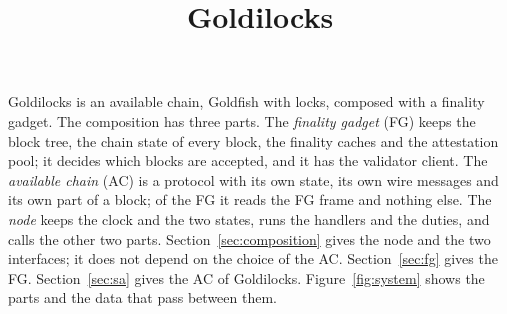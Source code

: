 \documentclass{article}
\title{Goldilocks}
\author{}
\date{}
\begin{document}
\maketitle

Goldilocks is an available chain, Goldfish with locks, composed with a
finality gadget.  The composition has three parts.  The \emph{finality gadget} (FG) keeps the
block tree, the chain state of every block, the finality caches and the
attestation pool; it decides which blocks are accepted, and it has the
validator client.  The \emph{available chain} (AC) is a protocol with its
own state, its own wire messages and its own part of a block; of the FG it
reads the FG frame and nothing else.  The \emph{node} keeps the clock and
the two states, runs the handlers and the duties, and calls the other two
parts.  Section~\ref{sec:composition} gives the node and the two
interfaces; it does not depend on the choice of the AC.
Section~\ref{sec:fg} gives the FG.  Section~\ref{sec:sa} gives the AC of
Goldilocks.  Figure~\ref{fig:system} shows the parts and the data
that pass between them.
\end{document}
